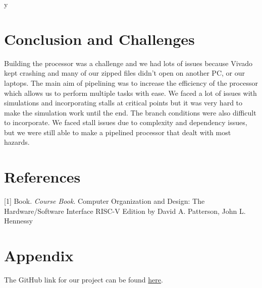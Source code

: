 y\documentclass[12pt]{article}
\begin{document}
\section{Conclusion and Challenges}\label{conclusion}
    Building the processor was a challenge and we had lots of issues because Vivado kept crashing and many of our zipped files didn't open on another PC, or our laptops. The main aim of pipelining was to increase the efficiency of the processor which allows us to perform multiple tasks with ease. We faced a lot of issues with simulations and incorporating stalls at critical points but it was very hard to make the simulation work until the end. The branch conditions were also difficult to incorporate. We faced stall issues due to complexity and dependency issues, but we were still able to make a pipelined processor that dealt with most hazards.

\section{References}

[1] Book. \textit{Course Book}. Computer Organization and Design: The Hardware/Software Interface RISC-V Edition by David A. Patterson, John L. Hennessy

\section{Appendix}
The GitHub link for our project can be found \href{https://github.com/haniakashif/CA-Project-Fall-23/tree/main}{here}.

    
\end{document}
